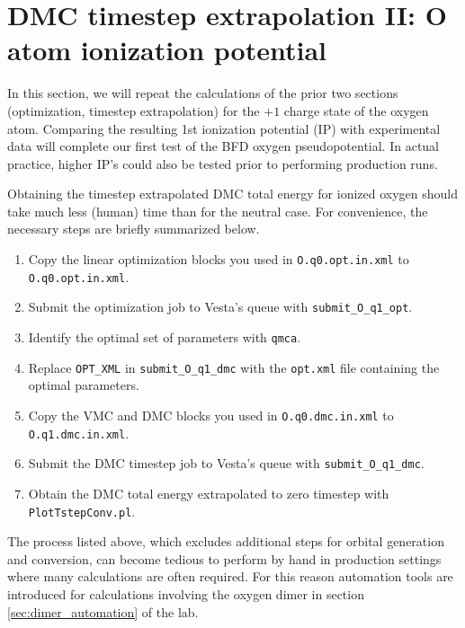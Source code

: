 \section{DMC timestep extrapolation II: O atom ionization potential}
In this section, we will repeat the calculations of the prior two sections (optimization, timestep extrapolation) for the $+1$ charge state of the oxygen atom.  Comparing the resulting 1st ionization potential (IP) with experimental data will complete our first test of the BFD oxygen pseudopotential.  In actual practice, higher IP's could also be tested prior to performing production runs.

Obtaining the timestep extrapolated DMC total energy for ionized oxygen should take much less (human) time than for the neutral case.  For convenience, the necessary steps are briefly summarized below.
\begin{enumerate}
  \item{Copy the linear optimization blocks you used in \texttt{O.q0.opt.in.xml} to  \texttt{O.q0.opt.in.xml}.}
  \item{Submit the optimization job to Vesta's queue with \texttt{submit\_O\_q1\_opt}}.
  \item{Identify the optimal set of parameters with \texttt{qmca}.}
  \item{Replace \texttt{OPT\_XML} in \texttt{submit\_O\_q1\_dmc} with the \texttt{opt.xml} file containing the optimal parameters.}
  \item{Copy the VMC and DMC blocks you used in \texttt{O.q0.dmc.in.xml} to \texttt{O.q1.dmc.in.xml}.}
  \item{Submit the DMC timestep job to Vesta's queue with \texttt{submit\_O\_q1\_dmc}}.
  \item{Obtain the DMC total energy extrapolated to zero timestep with \texttt{PlotTstepConv.pl}.}
\end{enumerate}
The process listed above, which excludes additional steps for orbital generation and conversion, can become tedious to perform by hand in production settings where many calculations are often required.  For this reason automation tools are introduced for calculations involving the oxygen dimer in section \ref{sec:dimer_automation} of the lab.  

